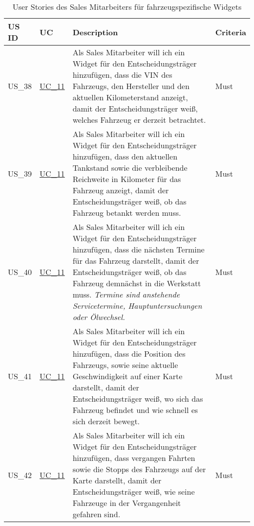   \sffamily
  \begin{footnotesize}
    \label{FahrzeugWidgets}
    \begin{longtable}[L L L]{ p{} p{} p{} p{} }
      \caption                       %
          {User Stories des Sales Mitarbeiters für fahrzeugspezifische Widgets} %
          \\
      \toprule
      \textbf{US ID} & \textbf{UC} & \textbf{Description} & \textbf{Criteria} \\
      \midrule
      \hypertarget{Ref:US38}{US\_38} & \hyperlink{Ref:UC11}{UC\_11} & Als Sales Mitarbeiter will ich ein Widget für den Entscheidungsträger hinzufügen, dass die VIN des Fahrzeugs, den Hersteller und den aktuellen Kilometerstand anzeigt, damit der Entscheidungsträger weiß, welches Fahrzeug er derzeit betrachtet. & Must \\
      \hypertarget{Ref:US39}{US\_39} & \hyperlink{Ref:UC11}{UC\_11} & Als Sales Mitarbeiter will ich ein Widget für den Entscheidungsträger hinzufügen, dass den aktuellen Tankstand sowie die verbleibende Reichweite in Kilometer für das Fahrzeug anzeigt, damit der Entscheidungsträger weiß, ob das Fahrzeug betankt werden muss. & Must \\
      \hypertarget{Ref:US40}{US\_40} & \hyperlink{Ref:UC11}{UC\_11} & Als Sales Mitarbeiter will ich ein Widget für den Entscheidungsträger hinzufügen, dass die nächsten Termine für das Fahrzeug darstellt, damit der Entscheidungsträger weiß, ob das Fahrzeug demnächst in die Werkstatt muss. 
      \newline\newline
      \emph{Termine sind anstehende Servicetermine, Hauptuntersuchungen oder Ölwechsel.} & Must \\
      \hypertarget{Ref:US41}{US\_41} & \hyperlink{Ref:UC11}{UC\_11} & Als Sales Mitarbeiter will ich ein Widget für den Entscheidungsträger hinzufügen, dass die Position des Fahrzeugs, sowie seine aktuelle Geschwindigkeit auf einer Karte darstellt, damit der Entscheidungsträger weiß, wo sich das Fahrzeug befindet und wie schnell es sich derzeit bewegt. & Must \\
      \hypertarget{Ref:US42}{US\_42} & \hyperlink{Ref:UC11}{UC\_11} & Als Sales Mitarbeiter will ich ein Widget für den Entscheidungsträger hinzufügen, dass vergangen Fahrten sowie die Stopps des Fahrzeugs auf der Karte darstellt, damit der Entscheidungsträger weiß, wie seine Fahrzeuge in der Vergangenheit gefahren sind. & Must \\

\end{longtable}
\end{footnotesize}
